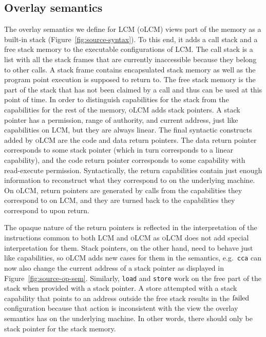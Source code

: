 \documentclass[acmsmall,review,showframe]{acmart}\settopmatter{printfolios=true,printccs=false,printacmref=false}
\newcommand{\trgcm}{\textsc{LCM}}
\newcommand{\srccm}{\textsc{oLCM}}
\begin{document}
\subsection{Overlay semantics}
The overlay semantics we define for \trgcm{} (\srccm{}) views part of the memory as a built-in stack (Figure~\ref{fig:source-syntax}).
To this end, it adds a call stack and a free stack memory to the executable configurations of \trgcm{}.
The call stack is a list with all the stack frames that are currently inaccessible because they belong to other calls.
A stack frame contains encapsulated stack memory as well as the program point execution is supposed to return to.
The free stack memory is the part of the stack that has not been claimed by a call and thus can be used at this point of time.
In order to distinguish capabilities for the stack from the capabilities for the rest of the memory, \srccm{} adds stack pointers.
A stack pointer has a permission, range of authority, and current address, just like capabilities on \trgcm{}, but they are always linear.
The final syntactic constructs added by \srccm{} are the code and data return pointers.
The data return pointer corresponds to some stack pointer (which in turn corresponds to a linear capability), and the code return pointer corresponds to some capability with read-execute permission.
Syntactically, the return capabilities contain just enough information to reconstruct what they correspond to on the underlying machine.
On \srccm{}, return pointers are generated by calls from the capabilities they correspond to on \trgcm{}, and they are turned back to the capabilities they correspond to upon return.

The opaque nature of the return pointers is reflected in the interpretation of the instructions common to both \trgcm{} and \srccm{} as \srccm{} does not add special interpretation for them.
Stack pointers, on the other hand, need to behave just like capabilities, so \srccm{} adds new cases for them in the semantics, e.g.\ \texttt{cca} can now also change the current address of a stack pointer as displayed in Figure~\ref{fig:source-op-sem}.
Similarly, \texttt{load} and \texttt{store} work on the free part of the stack when provided with a stack pointer.
A store attempted with a stack capability that points to an address outside the free stack results in the $\mathrm{failed}$ configuration because that action is inconsistent with the view the overlay semantics has on the underlying machine.
In other words, there should only be stack pointer for the stack memory.
\end{document}
